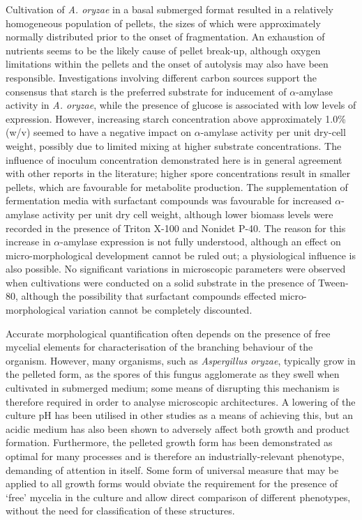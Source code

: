 Cultivation of \emph{A. oryzae} in a basal submerged format resulted in a relatively homogeneous population of pellets, the sizes of which were approximately normally distributed prior to the onset of fragmentation. An exhaustion of nutrients seems to be the likely cause of pellet break-up, although oxygen limitations within the pellets and the onset of autolysis may also have been responsible. Investigations involving different carbon sources support the consensus that starch is the preferred substrate for inducement of $\alpha$-amylase activity in \emph{A. oryzae}, while the presence of glucose is associated with low levels of expression. However, increasing starch concentration above approximately 1.0\% (w/v) seemed to have a negative impact on $\alpha$-amylase activity per unit dry-cell weight, possibly due to limited mixing at higher substrate concentrations. The influence of inoculum concentration demonstrated here is in general agreement with other reports in the literature; higher spore concentrations result in smaller pellets, which are favourable for metabolite production. The supplementation of fermentation media with surfactant compounds was favourable for increased $\alpha$-amylase activity per unit dry cell weight, although lower biomass levels were recorded in the presence of Triton X-100 and Nonidet P-40. The reason for this increase in $\alpha$-amylase expression is not fully understood, although an effect on micro-morphological development cannot be ruled out; a physiological influence is also possible. No significant variations in microscopic parameters were observed when cultivations were conducted on a solid substrate in the presence of Tween-80, although the possibility that surfactant compounds effected micro-morphological variation cannot be completely discounted.

Accurate morphological quantification often depends on the presence of free mycelial elements for characterisation of the branching behaviour of the organism. However, many organisms, such as \emph{Aspergillus oryzae}, typically grow in the pelleted form, as the spores of this fungus agglomerate as they swell when cultivated in submerged medium; some means of disrupting this mechanism is therefore required in order to analyse microscopic architectures. A lowering of the culture pH has been utilised in other studies as a means of achieving this, but an acidic medium has also been shown to adversely affect both growth and product formation. Furthermore, the pelleted growth form has been demonstrated as optimal for many processes and is therefore an industrially-relevant phenotype, demanding of attention in itself. Some form of universal measure that may be applied to all growth forms would obviate the requirement for the presence of \lq free' mycelia in the culture and allow direct comparison of different phenotypes, without the need for classification of these structures.